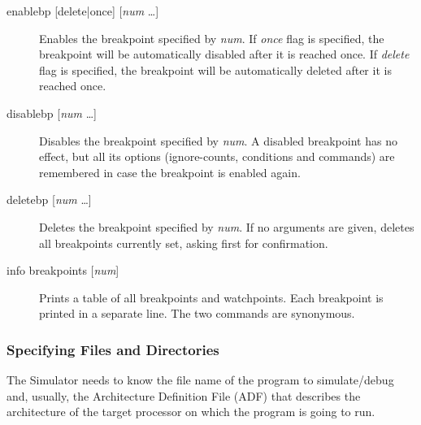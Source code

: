 \documentclass[twoside]{tceusermanual}
\begin{document}
\begin{description}
\item[enablebp {[delete|once] [\emph{num} \ldots]}] %
  Enables the breakpoint specified by \emph{num}.  If \emph{once} flag is
  specified, the breakpoint will be automatically disabled after it is
  reached once.  If \emph{delete} flag is specified, the breakpoint will be
  automatically deleted after it is reached once.
\item[disablebp {[\emph{num} \ldots]}] %
  Disables the breakpoint specified by \emph{num}.  A disabled breakpoint
  has no effect, but all its options (ignore-counts, conditions and
  commands) are remembered in case the breakpoint is enabled again.
\item[deletebp {[\emph{num} \ldots]}] %
  Deletes the breakpoint specified by \emph{num}.  If no arguments are
  given, deletes all breakpoints currently set, asking first for
  confirmation.
\item[info breakpoints {[\emph{num}]}] %
  Prints a table of all breakpoints and watchpoints.  Each breakpoint is
  printed in a separate line.  The two commands are synonymous.
\end{description}

\subsubsection{Specifying Files and Directories}
\label{ssec:debug-files}

The Simulator needs to know the file name of the program to
simulate/debug and, usually, the Architecture Definition File (ADF)
that describes the architecture of the target processor on which the
program is going to run.  
\end{document}
